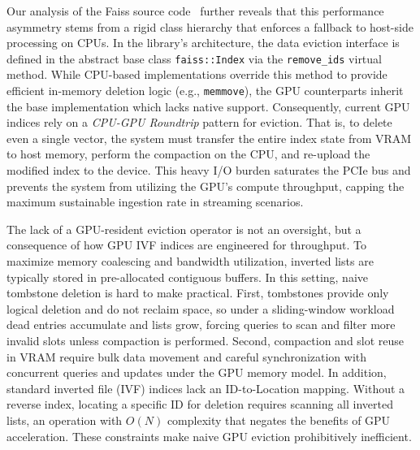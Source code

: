 \documentclass[sigconf,nonacm]{acmart}
\theoremstyle{plain}
\theoremstyle{definition}
\theoremstyle{remark}
\begin{document}
Our analysis of the Faiss source code~\cite{douze2024faiss} further reveals that this performance asymmetry stems from a rigid class hierarchy that enforces a fallback to host-side processing on CPUs. In the library's architecture, the data eviction interface is defined in the abstract base class \texttt{faiss::Index} via the \texttt{remove\_ids} virtual method. While CPU-based implementations override this method to provide efficient in-memory deletion logic (e.g., \texttt{memmove}), the GPU counterparts inherit the base implementation which lacks native support. Consequently, current GPU indices rely on a \emph{CPU-GPU Roundtrip} pattern for eviction. That is, to delete even a single vector, the system must transfer the entire index state from VRAM to host memory, perform the compaction on the CPU, and re-upload the modified index to the device. This heavy I/O burden saturates the PCIe bus and prevents the system from utilizing the GPU's compute throughput, capping the maximum sustainable ingestion rate in streaming scenarios.


The lack of a GPU-resident eviction operator is not an oversight, but a consequence of how GPU IVF indices are engineered for throughput. To maximize memory coalescing and bandwidth utilization, inverted lists are typically stored in pre-allocated contiguous buffers. In this setting, naive tombstone deletion is hard to make practical. First, tombstones provide only logical deletion and do not reclaim space, so under a sliding-window workload dead entries accumulate and lists grow, forcing queries to scan and filter more invalid slots unless compaction is performed. Second, compaction and slot reuse in VRAM require bulk data movement and careful synchronization with concurrent queries and updates under the GPU memory model. 
In addition, standard inverted file (IVF) indices lack an ID-to-Location mapping. Without a reverse index, locating a specific ID for deletion requires scanning all inverted lists, an operation with $O(N)$ complexity that negates the benefits of GPU acceleration. These constraints make naive GPU eviction prohibitively inefficient.

\end{document}
